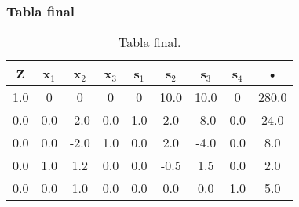 \documentclass{beamer}
\begin{document}
 
\begin{frame}  
\frametitle{Tabla final} 
\begin{table}[H] 
\begin{center} 
\begin{tabular}{|*{9}{c|}} 
\hline 
\textbf{Z}  & \textbf{x$_{1}$} & \textbf{x$_{2}$} & \textbf{x$_{3}$} & \textbf{s$_{1}$} & \textbf{s$_{2}$} & \textbf{s$_{3}$} & \textbf{s$_{4}$} & \textbf{•} \\\hline \hline 
1.0 & 0 & 0 & 0 & 0 & 10.0 & 10.0 & 0 & 280.0 \\\hline 
0.0 & 0.0 & -2.0 & 0.0 & 1.0 & 2.0 & -8.0 & 0.0 & 24.0\\ 
\hline 
0.0 & 0.0 & -2.0 & 1.0 & 0.0 & 2.0 & -4.0 & 0.0 & 8.0\\ 
\hline 
0.0 & 1.0 & 1.2 & 0.0 & 0.0 & -0.5 & 1.5 & 0.0 & 2.0\\ 
\hline 
0.0 & 0.0 & 1.0 & 0.0 & 0.0 & 0.0 & 0.0 & 1.0 & 5.0\\ 
\hline 
\end{tabular} 
\caption{Tabla final.} 
\end{center} 
\end{table} 
\end{frame} 
 
\end{document}
